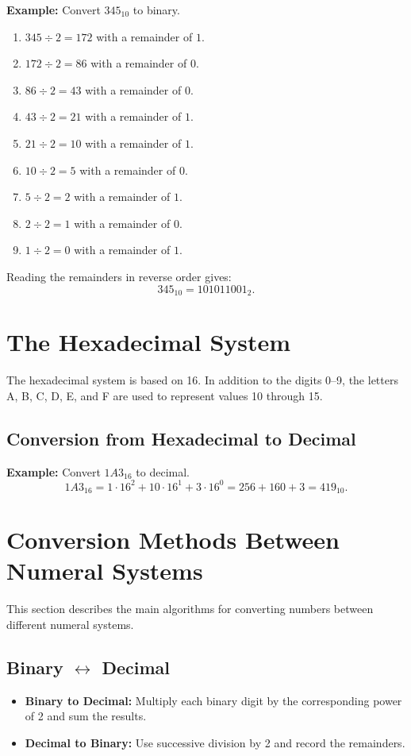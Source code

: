 \documentclass[12pt,a4paper]{article}
\begin{document}
\textbf{Example:} Convert \(345_{10}\) to binary.
\begin{enumerate}
    \item \(345 \div 2 = 172\) with a remainder of \(1\).
    \item \(172 \div 2 = 86\) with a remainder of \(0\).
    \item \(86 \div 2 = 43\) with a remainder of \(0\).
    \item \(43 \div 2 = 21\) with a remainder of \(1\).
    \item \(21 \div 2 = 10\) with a remainder of \(1\).
    \item \(10 \div 2 = 5\) with a remainder of \(0\).
    \item \(5 \div 2 = 2\) with a remainder of \(1\).
    \item \(2 \div 2 = 1\) with a remainder of \(0\).
    \item \(1 \div 2 = 0\) with a remainder of \(1\).
\end{enumerate}
Reading the remainders in reverse order gives:
\[
345_{10} = 101011001_2.
\]

\section{The Hexadecimal System}
The hexadecimal system is based on 16. In addition to the digits 0--9, the letters A, B, C, D, E, and F are used to represent values 10 through 15.

\subsection{Conversion from Hexadecimal to Decimal}
\textbf{Example:} Convert \(1A3_{16}\) to decimal.
\[
1A3_{16} = 1\cdot16^2 + 10\cdot16^1 + 3\cdot16^0 = 256 + 160 + 3 = 419_{10}.
\]

\section{Conversion Methods Between Numeral Systems}
This section describes the main algorithms for converting numbers between different numeral systems.

\subsection{Binary \(\leftrightarrow\) Decimal}
\begin{itemize}
    \item \textbf{Binary to Decimal:} Multiply each binary digit by the corresponding power of 2 and sum the results.
    \item \textbf{Decimal to Binary:} Use successive division by 2 and record the remainders.
\end{itemize}
\end{document}
